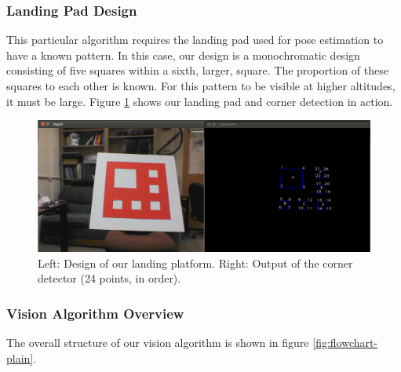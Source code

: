 \documentclass{acm_proc_article-sp}
\begin{document}
\subsubsection{Landing Pad Design}
This particular algorithm requires the landing pad used for pose estimation to have a known pattern. In this case, our design is a monochromatic design consisting of five squares within a sixth, larger, square. The proportion of these squares to each other is known. For this pattern to be visible at higher altitudes, it must be large. Figure \ref{fig:corners} shows our landing pad and corner detection in action.


\begin{figure}[b]
    \centering
    \includegraphics[width=0.9\linewidth]{images/corners.png}
    \caption{
        Left: Design of our landing platform.
        Right: Output of the corner detector (24 points, in order).
    }
    \label{fig:corners}
\end{figure}

\subsubsection{Vision Algorithm Overview}
The overall structure of our vision algorithm is shown in figure \ref{fig:flowchart-plain}.
\end{document}
